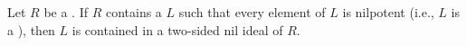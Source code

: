 \begin{conjecture} \label{conjecture:kothe_conjecture}
Let $R$ be a . If $R$ contains a  $L$ such that every element of $L$ is nilpotent (i.e., $L$ is a ), then $L$ is contained in a two-sided nil ideal of $R$.
\end{conjecture}
